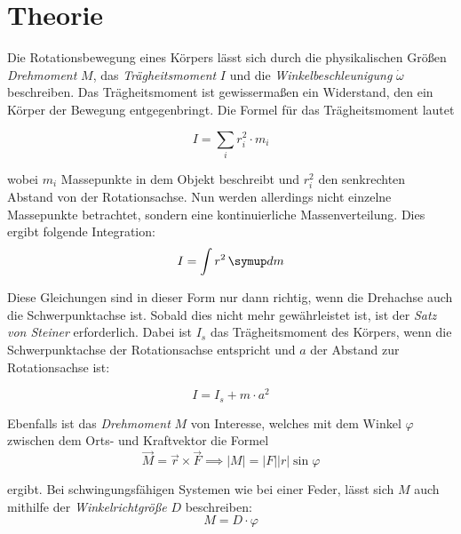 \section{Theorie \tiny{\cite{v101}}}
\label{sec:Theorie}
\setlength{\parindent}{0pt}

Die Rotationsbewegung eines Körpers lässt sich durch die physikalischen Größen \textit{Drehmoment} $M$, das 
\textit{Trägheitsmoment} $I$ und die \textit{Winkelbeschleunigung} $\dot{\omega}$ beschreiben.
Das Trägheitsmoment ist gewissermaßen ein Widerstand, den ein Körper der Bewegung entgegenbringt.
Die Formel für das Trägheitsmoment lautet



\begin{equation*}
    I = \sum_{i} r_{i}^2 \cdot m_{i} 
\end{equation*}

wobei $m_{i}$ Massepunkte in dem Objekt beschreibt und $r_{i}^2$ den senkrechten Abstand von der Rotationsachse.
Nun werden allerdings nicht einzelne Massepunkte betrachtet, sondern eine kontinuierliche Massenverteilung.
Dies ergibt folgende Integration:
\begin{equation}
    I = \int r^2 \dif{m}
\end{equation}

Diese Gleichungen sind in dieser Form nur dann richtig, wenn die Drehachse auch die Schwerpunktachse ist.
Sobald dies nicht mehr gewährleistet ist, ist der \textit{Satz von Steiner} erforderlich.
Dabei ist $I_{s}$ das Trägheitsmoment des Körpers, wenn die Schwerpunktachse der Rotationsachse entspricht
und $a$ der Abstand zur Rotationsachse ist:

\begin{equation} \label{eq:SatzvSteiner}
    I = I_{s} + m \cdot a^2
\end{equation}

Ebenfalls ist das \textit{Drehmoment} $M$ von Interesse, welches mit dem Winkel $\varphi$ zwischen dem Orts- und Kraftvektor die Formel
\begin{equation} \label{eq:drehmoment}
    \vec{M} = \vec{r} \times \vec{F} \implies \lvert M \rvert = \lvert F \rvert \lvert r \rvert \sin{\varphi}
\end{equation}

ergibt. Bei schwingungsfähigen Systemen wie bei einer Feder, lässt sich $M$ auch mithilfe der \textit{Winkelrichtgröße} $D$ beschreiben:
\begin{equation} \label{eq:drehmomentwinkel}
    M = D \cdot \varphi
\end{equation}

